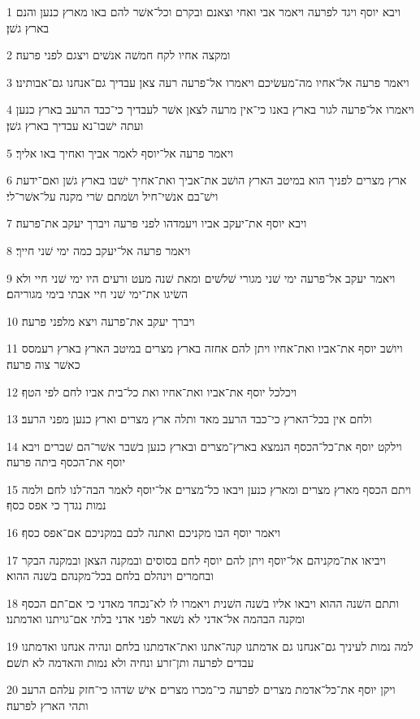 \par 1 ויבא יוסף ויגד לפרעה ויאמר אבי ואחי וצאנם ובקרם וכל־אשׁר להם באו מארץ כנען והנם בארץ גשׁן׃
\par 2 ומקצה אחיו לקח חמשׁה אנשׁים ויצגם לפני פרעה׃
\par 3 ויאמר פרעה אל־אחיו מה־מעשׂיכם ויאמרו אל־פרעה רעה צאן עבדיך גם־אנחנו גם־אבותינו׃
\par 4 ויאמרו אל־פרעה לגור בארץ באנו כי־אין מרעה לצאן אשׁר לעבדיך כי־כבד הרעב בארץ כנען ועתה ישׁבו־נא עבדיך בארץ גשׁן׃
\par 5 ויאמר פרעה אל־יוסף לאמר אביך ואחיך באו אליך׃
\par 6 ארץ מצרים לפניך הוא במיטב הארץ הושׁב את־אביך ואת־אחיך ישׁבו בארץ גשׁן ואם־ידעת וישׁ־בם אנשׁי־חיל ושׂמתם שׂרי מקנה על־אשׁר־לי׃
\par 7 ויבא יוסף את־יעקב אביו ויעמדהו לפני פרעה ויברך יעקב את־פרעה׃
\par 8 ויאמר פרעה אל־יעקב כמה ימי שׁני חייך׃
\par 9 ויאמר יעקב אל־פרעה ימי שׁני מגורי שׁלשׁים ומאת שׁנה מעט ורעים היו ימי שׁני חיי ולא השׂיגו את־ימי שׁני חיי אבתי בימי מגוריהם׃
\par 10 ויברך יעקב את־פרעה ויצא מלפני פרעה׃
\par 11 ויושׁב יוסף את־אביו ואת־אחיו ויתן להם אחזה בארץ מצרים במיטב הארץ בארץ רעמסס כאשׁר צוה פרעה׃
\par 12 ויכלכל יוסף את־אביו ואת־אחיו ואת כל־בית אביו לחם לפי הטף׃
\par 13 ולחם אין בכל־הארץ כי־כבד הרעב מאד ותלה ארץ מצרים וארץ כנען מפני הרעב׃
\par 14 וילקט יוסף את־כל־הכסף הנמצא בארץ־מצרים ובארץ כנען בשׁבר אשׁר־הם שׁברים ויבא יוסף את־הכסף ביתה פרעה׃
\par 15 ויתם הכסף מארץ מצרים ומארץ כנען ויבאו כל־מצרים אל־יוסף לאמר הבה־לנו לחם ולמה נמות נגדך כי אפס כסף׃
\par 16 ויאמר יוסף הבו מקניכם ואתנה לכם במקניכם אם־אפס כסף׃
\par 17 ויביאו את־מקניהם אל־יוסף ויתן להם יוסף לחם בסוסים ובמקנה הצאן ובמקנה הבקר ובחמרים וינהלם בלחם בכל־מקנהם בשׁנה ההוא׃
\par 18 ותתם השׁנה ההוא ויבאו אליו בשׁנה השׁנית ויאמרו לו לא־נכחד מאדני כי אם־תם הכסף ומקנה הבהמה אל־אדני לא נשׁאר לפני אדני בלתי אם־גויתנו ואדמתנו׃
\par 19 למה נמות לעיניך גם־אנחנו גם אדמתנו קנה־אתנו ואת־אדמתנו בלחם ונהיה אנחנו ואדמתנו עבדים לפרעה ותן־זרע ונחיה ולא נמות והאדמה לא תשׁם׃
\par 20 ויקן יוסף את־כל־אדמת מצרים לפרעה כי־מכרו מצרים אישׁ שׂדהו כי־חזק עלהם הרעב ותהי הארץ לפרעה׃
